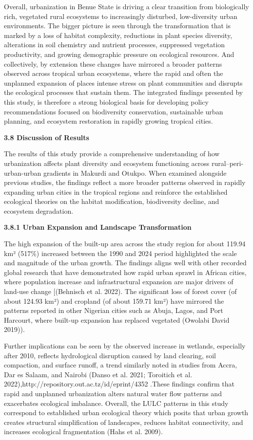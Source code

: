 Overall, urbanization in Benue State is driving a clear transition from biologically rich, vegetated rural ecosystems to increasingly disturbed, low-diversity urban environments. The bigger picture is seen through the transformation that is marked by a loss of habitat complexity, reductions in plant species diversity, alterations in soil chemistry and nutrient processes, suppressed vegetation productivity, and growing demographic pressure on ecological resources. And collectively, by extension these changes have mirrored a broader patterns observed across tropical urban ecosystems, where the rapid and often the unplanned expansion of places intense stress on plant communities and disrupts the ecological processes that sustain them. The integrated findings presented by this study, is therefore a strong biological basis for developing policy recommendations focused on biodiversity conservation, sustainable urban planning, and ecosystem restoration in rapidly growing tropical cities.

{}\textbf{3.8 Discussion of Results}

The results of this study provide a comprehensive understanding of how urbanization affects plant diversity and ecosystem functioning across rural--peri-urban-urban gradients in Makurdi and Otukpo. When examined alongside previous studies, the findings reflect a more broader patterns observed in rapidly expanding urban cities in the tropical regions and reinforce the established ecological theories on the habitat modification, biodiversity decline, and ecosystem degradation.

{}\textbf{3.8.1 Urban Expansion and Landscape Transformation}

The high expansion of the built-up area across the study region for about 119.94 km² (517\%) increased between the 1990 and 2024 period highlighted the scale and magnitude of the urban growth. The findings aligns well with other recorded global research that have demonstrated how rapid urban sprawl in African cities, where population increase and infrastructural expansion are major drivers of land-use change {[}(Behnisch et al. 2022). The significant loss of forest cover (of about 124.93 km²) and cropland (of about 159.71 km²) have mirrored the patterns reported in other Nigerian cities such as Abuja, Lagos, and Port Harcourt, where built-up expansion has replaced vegetated (Owolabi David 2019)).

Further implications can be seen by the observed increase in wetlands, especially after 2010, reflects hydrological disruption caused by land clearing, soil compaction, and surface runoff, a trend similarly noted in studies from Accra, Dar es Salaam, and Nairobi (Danso et al. 2021; Toroitich et al. 2022),http://repository.out.ac.tz/id/eprint/4352 .These findings confirm that rapid and unplanned urbanization alters natural water flow patterns and exacerbates ecological imbalance. Overall, the LULC patterns in this study correspond to established urban ecological theory which posits that urban growth creates structural simplification of landscapes, reduces habitat connectivity, and increases ecological fragmentation (Hahs et al. 2009).

